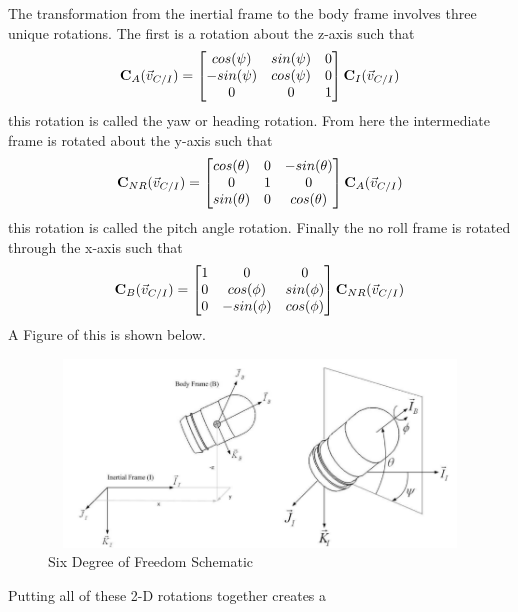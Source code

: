 \documentclass{article}
\begin{document}
The transformation from the inertial frame to the body frame involves
three unique rotations. The first is a rotation about the z-axis such
that
\begin{equation}
{\bf C}_A(\vec{v}_{C/I}) = \begin{bmatrix} cos(\psi) & sin(\psi) & 0
  \\ -sin(\psi) & cos(\psi) & 0 \\ 0 & 0 & 1 \end{bmatrix} {\bf C}_I(\vec{v}_{C/I})
\end{equation}
this rotation is called the yaw or heading rotation. From here the
intermediate frame is rotated about the y-axis such that
\begin{equation}
{\bf C}_{NR}(\vec{v}_{C/I}) = \begin{bmatrix} cos(\theta) & 0 &
  -sin(\theta) \\ 0 & 1 & 0 \\ sin(\theta) & 0 & cos(\theta) \end{bmatrix} {\bf C}_A(\vec{v}_{C/I})
\end{equation}
this rotation is called the pitch angle rotation. Finally the no roll
frame is rotated through the x-axis such that
\begin{equation}
{\bf C}_{B}(\vec{v}_{C/I}) = \begin{bmatrix} 1 & 0 & 0 \\ 0 & cos(\phi) & sin(\phi)
  \\ 0 & -sin(\phi) & cos(\phi) \end{bmatrix} {\bf C}_{NR}(\vec{v}_{C/I})
\end{equation}
A Figure of this is shown below.
\begin{figure}[H]
  \begin{center}
  \includegraphics[height=50mm, width=120mm]{Figures/6DOFrocketschematic.png}
  \end{center}
  \caption{Six Degree of Freedom Schematic}
\end{figure}
Putting all of these 2-D rotations together creates a
\end{document}
